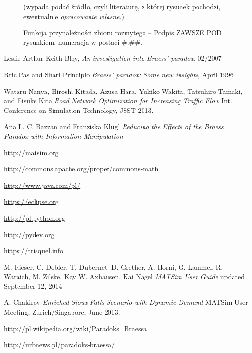 \documentclass[twoside,12pt]{report}
\begin{document}
\begin{figure}[!t]
\centering
\caption{Funkcja przynależności zbioru rozmytego -- Podpis ZAWSZE POD rysunkiem,
numeracja w postaci \#.\#\#. } (wypada podać źródło, czyli literaturę,
z której rysunek pochodzi, ewentualnie {\em opracowanie własne}.)
\label{fig.funkcja.przyn}
\end{figure}

\listoffigures

\listoftables

\lstlistoflistings

\begin{thebibliography}{99}
	Leslie Arthur Keith Bloy, 
	\newblock \textit{An investigation into Braess’ paradox}, 02/2007

	Rric Pas and Shari Principio
	\newblock \textit{Braess’ paradox: Some new insights}, April 1996

	Wataru Nanya, Hiroshi Kitada, Azusa Hara, Yukiko Wakita, Tatsuhiro Tamaki, and Eisuke Kita
	\newblock \textit{Road Network Optimization for Increasing Traffic Flow}
	\newblock Int. Conference on Simulation Technology, JSST 2013.

	Ana L. C. Bazzan and Franziska Klügl
	\newblock \textit{Reducing the Effects of the Braess Paradox with Information Manipulation}

	\url{http://matsim.org}	

	\url{http://commons.apache.org/proper/commons-math}

	\url{http://www.java.com/pl/}

	\url{https://eclipse.org}
				
	\url{http://pl.python.org}
	
	\url{http://pydev.org}
	
	\url{https://trisquel.info}
			
	M. Rieser, C. Dobler, T. Dubernet, D. Grether, A. Horni, G. Lammel, R. Waraich, M. Zilske, Kay W. Axhausen, Kai Nagel
	\newblock \textit{MATSim User Guide}
	\newblock updated September 12, 2014

	A. Chakirov
	\newblock \textit{Enriched Sioux Falls Scenario with Dynamic Demand}
	\newblock MATSim User Meeting, Zurich/Singapore, June 2013.
	
	\url{http://pl.wikipedia.org/wiki/Paradoks_Braessa}
	
	\url{http://urbnews.pl/paradoks-braessa/}

\end{thebibliography}
\end{document}
